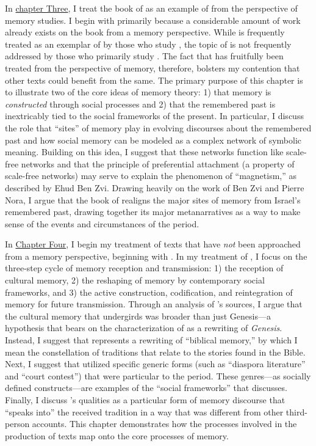 In \hyperref[chap:chronicles]{chapter Three}, I treat the book of \chronicles as an example of \rwb from the perspective of memory studies. I begin with \chronicles primarily because a considerable amount of work already exists on the book from a memory perspective. While \chronicles is frequently treated as an exemplar of \rwb by those who study \rwb, the topic of \rwb is not frequently addressed by those who primarily study \chronicles. The fact that \chronicles has fruitfully been treated from the perspective of memory, therefore, bolsters my contention that other \rwb texts could benefit from the same. The primary purpose of this chapter is to illustrate two of the core ideas of memory theory: 1) that memory is \emph{constructed} through social processes and 2) that the remembered past is inextricably tied to the social frameworks of the present. In particular, I discuss the role that ``sites'' of memory play in evolving discourses about the remembered past and how social memory can be modeled as a complex network of symbolic meaning. Building on this idea, I suggest that these networks function like scale-free networks and that the principle of preferential attachment (a property of scale-free networks) may serve to explain the phenomenon of ``magnetism,'' as described by Ehud Ben Zvi. Drawing heavily on the work of Ben Zvi and Pierre Nora, I argue that the book of \chronicles realigns the major sites of memory from Israel's remembered past, drawing together its major metanarratives as a way to make sense of the events and circumstances of the \secondtemple period.

In \hyperref[chap:ga]{Chapter Four}, I begin my treatment of \rwb texts that have \emph{not} been approached from a memory perspective, beginning with \ga. In my treatment of \ga, I focus on the three-step cycle of memory reception and transmission: 1) the reception of cultural memory, 2) the reshaping of memory by contemporary social frameworks, and 3) the active construction, codification, and reintegration of memory for future transmission. Through an analysis of \ga's sources, I argue that the cultural memory that undergirds \ga was broader than just Genesis---a hypothesis that bears on the characterization of \ga as a rewriting of \emph{Genesis}. Instead, I suggest that \ga represents a rewriting of ``biblical memory,'' by which I mean the constellation of traditions that relate to the stories found in the Bible. Next, I suggest that \ga utilized specific generic forms (such as ``diaspora literature'' and ``court contest'') that were particular to the \secondtemple period. These genres---as socially defined constructs---are examples of the ``social frameworks'' that \halbwachs discusses. Finally, I discuss \ga's \psgraphical qualities as a particular form of memory discourse that ``speaks into'' the received tradition in a way that was different from other third-person accounts. This chapter demonstrates how the processes involved in the production of \rwb texts map onto the core processes of memory.

